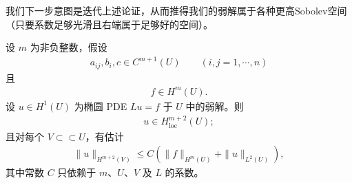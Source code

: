 \documentclass[../../main.tex]{subfiles}
\begin{document}
我们下一步意图是迭代上述论证，从而推得我们的弱解属于各种更高Sobolev空间（只要系数足够光滑且右端属于足够好的空间）。

\begin{theorem}[更高内部正则性]\label{theorem:ch06-更高内部正则}设 $m$ 为非负整数，假设
\begin{align}
a_{ij},b_{i},c\in C^{m+1}(U)\qquad (i,j=1,\cdots,n)
\end{align}
且
\begin{align}
f\in H^{m}(U).
\end{align}
设 $u\in H^{1}(U)$ 为椭圆 PDE $Lu=f$ 于 $U$ 中的弱解。则
\begin{align}
u\in H^{m+2}_{\mathrm{loc}}(U);
\end{align}
且对每个 $V\subset \subset U$，有估计
\begin{align}
\|u\|_{H^{m+2}(V)}\leqslant C(\|f\|_{H^{m}(U)}+\|u\|_{L^{2}(U)}),
\end{align}
其中常数 $C$ 只依赖于 $m$、$U$、$V$ 及 $L$ 的系数。
\end{theorem}
\end{document}
